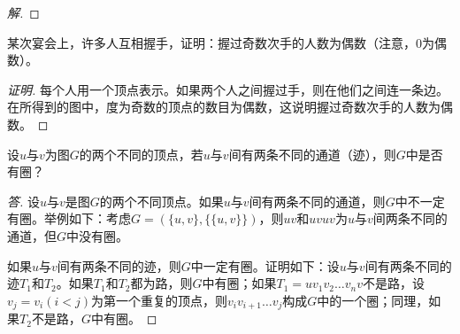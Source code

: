 \documentclass{article}
\begin{document}
\begin{CJK}{UTF8}{gbsn}
\begin{proof}[解]
\end{proof}
\begin{Exercise}
某次宴会上，许多人互相握手，证明：握过奇数次手的人数为偶数（注意，$0$为偶数）。
\end{Exercise}
\begin{proof}[证明]
  每个人用一个顶点表示。如果两个人之间握过手，则在他们之间连一条边。在所得到的图中，度为奇数的顶点的数目为偶数，这说明握过奇数次手的人数为偶数。
\end{proof}
\begin{Exercise}
设$u$与$v$为图$G$的两个不同的顶点，若$u$与$v$间有两条不同的通道（迹），则$G$中是否有圈？
\end{Exercise}
\begin{proof}[答]
  设$u$与$v$是图$G$的两个不同顶点。如果$u$与$v$间有两条不同的通道，则$G$中不一定有圈。举例如下：考虑$G=(\{u,v\},\{\{u,v\}\})$，则$uv$和$uvuv$为$u$与$v$间两条不同的通道，但$G$中没有圈。

  如果$u$与$v$间有两条不同的迹，则$G$中一定有圈。证明如下：设$u$与$v$间有两条不同的迹$T_1$和$T_2$。如果$T_1$和$T_2$都为路，则$G$中有圈；如果$T_1=uv_1v_2\ldots v_nv$不是路，设$v_j=v_i(i<j)$为第一个重复的顶点，则$v_iv_{i+1}\ldots v_j$构成$G$中的一个圈；同理，如果$T_2$不是路，$G$中有圈。
  

\end{proof}
\end{CJK}
\end{document}
